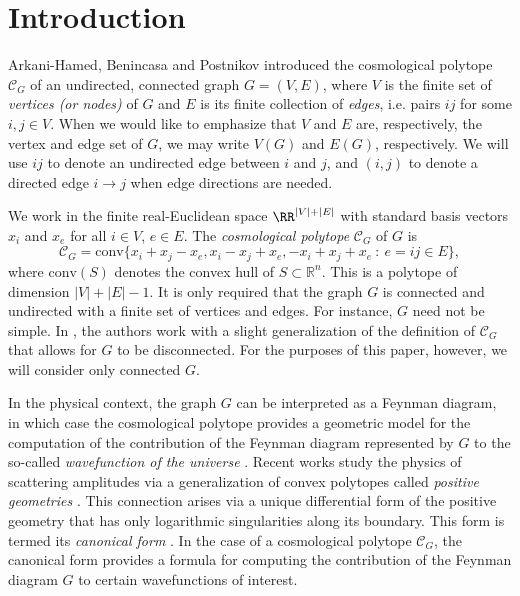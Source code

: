 \section{Introduction}
\label{sec: intro}

Arkani-Hamed, Benincasa and Postnikov \cite{arkani2017cosmological} introduced the cosmological polytope $\mathcal{C}_G$ of an undirected, connected graph $G = (V,E)$, where $V$ is the finite set of \emph{vertices (or nodes)} of $G$ and $E$ is its finite collection of \emph{edges}, i.e. pairs $ij$ for some $i,j\in V$.
When we would like to emphasize that $V$ and $E$ are, respectively, the vertex and edge set of $G$, we may write $V(G)$ and $E(G)$, respectively. 
We will use $ij$ to denote an undirected edge between $i$ and $j$, and $(i,j)$ to denote a directed edge $i\rightarrow j$ when edge directions are needed.

We work in the finite real-Euclidean space $\RR^{|V|+|E|}$ with standard basis vectors $x_i$ and $x_e$ for all $i\in V$, $e\in E$. 
The \emph{cosmological polytope} $\mathcal{C}_G$ of $G$ is 
\[
        \mathcal{C}_G=\text{conv}\{x_i+x_j-x_e,x_i-x_j+x_e,-x_i+x_j+x_e ~:~ e = ij\in E\},
\]
where $\text{conv}(S)$ denotes the convex hull of $S\subset \mathbb{R}^n$.  
This is a polytope of dimension $|V| + |E| - 1$. 
It is only required that the graph $G$ is connected and undirected with a finite set of vertices and edges. 
For instance, $G$ need not be simple. 
In \cite{kuhne2022faces}, the authors work with a slight generalization of the definition of $\mathcal{C}_G$ that allows for $G$ to be disconnected. 
For the purposes of this paper, however, we will consider only connected $G$. 
 

In the physical context, the graph $G$ can be interpreted as a Feynman diagram, in which case the cosmological polytope provides a geometric model for the computation of the contribution of the Feynman diagram represented by $G$ to the so-called \emph{wavefunction of the universe} \cite{arkani2017cosmological}. 
Recent works study the physics of scattering amplitudes via a generalization of convex polytopes called \emph{positive geometries} \cite{arkani2017positive}. 
This connection arises via a unique differential form of the positive geometry that has only logarithmic singularities along its boundary. 
This form is termed its \emph{canonical form} \cite{arkani2017positive}.
In the case of a cosmological polytope $\mathcal{C}_G$, the canonical form provides a formula for computing the contribution of the Feynman diagram $G$ to certain wavefunctions of interest. 

